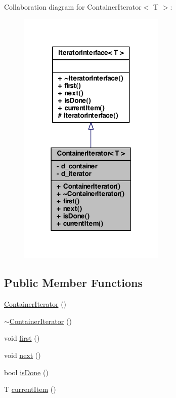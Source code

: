 Collaboration diagram for ContainerIterator$<$ T $>$:
\nopagebreak
\begin{figure}[H]
\begin{center}
\leavevmode
\includegraphics[width=198pt]{class_container_iterator__coll__graph}
\end{center}
\end{figure}
\subsection*{Public Member Functions}
\begin{DoxyCompactItemize}
\item 
\hyperlink{class_container_iterator_a5cc7e5a75c276e224706891547e3cf24}{ContainerIterator} ()
\item 
\hyperlink{class_container_iterator_a448896907e42b5676b9cccd0b59e0e43}{$\sim$ContainerIterator} ()
\item 
void \hyperlink{class_container_iterator_a98924935aa2d0b5f1d3bdbb8b3bc0a69}{first} ()
\item 
void \hyperlink{class_container_iterator_ae9996be7cbe4ada65c214372da509049}{next} ()
\item 
bool \hyperlink{class_container_iterator_a533dcd7d4c59663c0ae99f67f4b5e9c6}{isDone} ()
\item 
T \hyperlink{class_container_iterator_a088e991e5eade5740290342a49d71467}{currentItem} ()
\end{DoxyCompactItemize}
